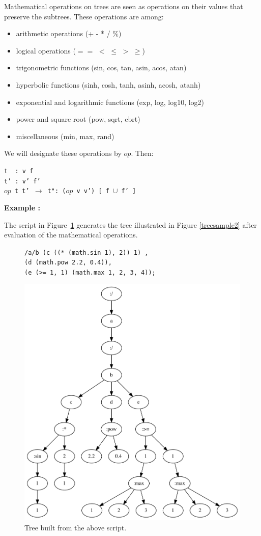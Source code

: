\documentclass{article}
\newcommand{\exemple}	{\vspace*{1mm}\hspace*{-4mm}\textbf{Example :}}
\newcommand{\code}	[2][0.9]		{\vspace{0mm}\begin{center}\colorbox{mygrey}{
							\begin{minipage}[t]{#1\columnwidth} 
							{\small \texttt{#2}}
							\end{minipage}}\end{center}}
\newcommand{\op}	[1]		{\vspace{0mm}\begin{center}\colorbox{mygrey}{
							\begin{minipage}[t]{0.9\columnwidth} 
							{\small \texttt{#1}}
							\end{minipage}}\end{center}}
\newcommand{\binop}		{$op$}
\newcommand{\ulb}		{\hspace*{4mm}}
\begin{document}
Mathematical operations on trees are seen as operations on their values that preserve the subtrees. These operations are among:
\begin{itemize}
 \setlength\itemsep{0.0em}
\item arithmetic operations (+ - * / \%)
\item logical operations ($==$ $<$ $\leq$ $>$ $\geq$)
\item trigonometric functions (sin, cos, tan, asin, acos, atan)
\item hyperbolic functions (sinh, cosh, tanh, asinh, acosh, atanh)
\item exponential and logarithmic functions (exp, log, log10, log2)
\item power and square root (pow, sqrt, cbrt)
\item miscellaneous  (min, max, rand)
\end{itemize}

We will designate these operations by \binop. Then:
\op{t\ \ :  v f\\
t' : v' f'\\
\binop\ t t'  $\to$  t":  (\binop\ v v') [ f $\cup$ f' ]  
}

\exemple

The script in Figure~\ref{parsesample2} generates the tree illustrated in Figure \ref{treesample2} after evaluation of the mathematical operations.

\begin{figure}[htbp]
\code{/a/b 	(c ((* (math.sin 1), 2)) 1) ,\\
\ulb		(d (math.pow 2.2, 0.4)),\\
\ulb		(e (>= 1, 1) (math.max 1, 2, 3, 4));}
\begin{center}
\includegraphics[width=1.\columnwidth]{tree/sample3}
\caption{Tree built from the above script.}
\label{parsesample2}
\end{center}
\end{figure}
\end{document}
